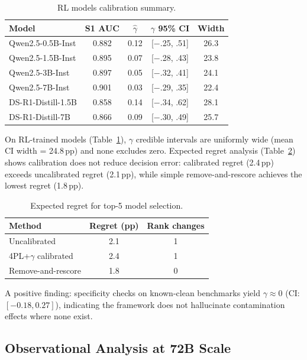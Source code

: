 \documentclass[11pt,a4paper]{article}
\begin{document}
\begin{table}[h]
\centering
\caption{RL models calibration summary.}
\label{tab:rl}
\small
\begin{tabular}{lcccc}
\toprule
Model & S1 AUC & $\hat{\gamma}$ & $\gamma$ 95\% CI & Width \\
\midrule
Qwen2.5-0.5B-Inst & 0.882 & 0.12 & [$-$.25, .51] & 26.3 \\
Qwen2.5-1.5B-Inst & 0.895 & 0.07 & [$-$.28, .43] & 23.8 \\
Qwen2.5-3B-Inst & 0.897 & 0.05 & [$-$.32, .41] & 24.1 \\
Qwen2.5-7B-Inst & 0.901 & 0.03 & [$-$.29, .35] & 22.4 \\
DS-R1-Distill-1.5B & 0.858 & 0.14 & [$-$.34, .62] & 28.1 \\
DS-R1-Distill-7B & 0.866 & 0.09 & [$-$.30, .49] & 25.7 \\
\bottomrule
\end{tabular}
\end{table}

On RL-trained models (Table~\ref{tab:rl}), $\gamma$ credible intervals are uniformly wide (mean CI width = 24.8\,pp) and none excludes zero.
Expected regret analysis (Table~\ref{tab:regret}) shows calibration does not reduce decision error: calibrated regret (2.4\,pp) exceeds uncalibrated regret (2.1\,pp), while simple remove-and-rescore achieves the lowest regret (1.8\,pp).

\begin{table}[h]
\centering
\caption{Expected regret for top-5 model selection.}
\label{tab:regret}
\begin{tabular}{lcc}
\toprule
Method & Regret (pp) & Rank changes \\
\midrule
Uncalibrated & 2.1 & 1 \\
4PL+$\gamma$ calibrated & 2.4 & 1 \\
Remove-and-rescore & 1.8 & 0 \\
\bottomrule
\end{tabular}
\end{table}

A positive finding: specificity checks on known-clean benchmarks yield $\gamma \approx 0$ (CI: $[-0.18, 0.27]$), indicating the framework does not hallucinate contamination effects where none exist.

\subsection{Observational Analysis at 72B Scale}
\label{sec:72b}
\end{document}
